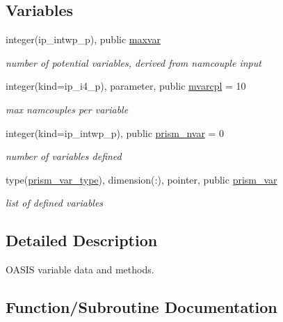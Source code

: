 \subsection*{Variables}
\begin{DoxyCompactItemize}
\item 
integer(ip\+\_\+intwp\+\_\+p), public \hyperlink{namespacemod__oasis__var_a151c4be67882fc8d02f66e4a1822b692}{maxvar}
\begin{DoxyCompactList}\small\item\em number of potential variables, derived from namcouple input \end{DoxyCompactList}\item 
integer(kind=ip\+\_\+i4\+\_\+p), parameter, public \hyperlink{namespacemod__oasis__var_a687d6dce16699f36ae3a67accfdba3a9}{mvarcpl} = 10
\begin{DoxyCompactList}\small\item\em max namcouples per variable \end{DoxyCompactList}\item 
integer(kind=ip\+\_\+intwp\+\_\+p), public \hyperlink{namespacemod__oasis__var_a095f8ad84e6afbcbe1744d4a9f924e08}{prism\+\_\+nvar} = 0
\begin{DoxyCompactList}\small\item\em number of variables defined \end{DoxyCompactList}\item 
type(\hyperlink{structmod__oasis__var_1_1prism__var__type}{prism\+\_\+var\+\_\+type}), dimension(\+:), pointer, public \hyperlink{namespacemod__oasis__var_ae66c490437c2960d795fbd3d2c773a0a}{prism\+\_\+var}
\begin{DoxyCompactList}\small\item\em list of defined variables \end{DoxyCompactList}\end{DoxyCompactItemize}


\subsection{Detailed Description}
O\+A\+S\+IS variable data and methods. 

\subsection{Function/\+Subroutine Documentation}
\mbox{\label{namespacemod__oasis__var_ab28530889758da2183e09f345c0993f1}} 
